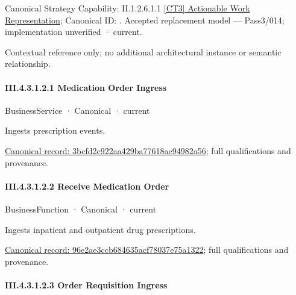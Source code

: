 {\small Canonical Strategy Capability: II.1.2.6.1.1 \hyperref[element:33d9038c95ab4c26893deb8fa92194e1]{[CT3] Actionable Work Representation}; Canonical ID: \texttt{}. Accepted replacement model — Pass3/014; implementation unverified · current.}\par
Contextual reference only; no additional architectural instance or semantic relationship.\par
\paragraph*{III.4.3.1.2.1 Medication Order Ingress}
\label{navigation:III.4.3.1.2.1}

\label{element:3bcfd2c922aa429ba77618ac94982a56}
{\small BusinessService · Canonical · current}\par

Ingests prescription events.


{\footnotesize \href{../../../../../../../../continuum/business/business-service/3bcfd2c922aa429ba77618ac94982a56.md}{Canonical record: 3bcfd2c922aa429ba77618ac94982a56}; full qualifications and provenance.}\par
\paragraph*{III.4.3.1.2.2 Receive Medication Order}
\label{navigation:III.4.3.1.2.2}

\label{element:96e2ae3ccb684635acf78037e75a1322}
{\small BusinessFunction · Canonical · current}\par

Ingests inpatient and outpatient drug prescriptions.


{\footnotesize \href{../../../../../../../../continuum/business/business-function/96e2ae3ccb684635acf78037e75a1322.md}{Canonical record: 96e2ae3ccb684635acf78037e75a1322}; full qualifications and provenance.}\par
\paragraph*{III.4.3.1.2.3 Order Requisition Ingress}
\label{navigation:III.4.3.1.2.3}

